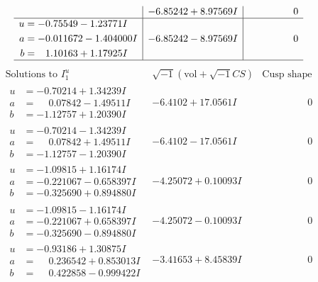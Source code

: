\documentclass[1p]{elsarticle_modified}
\theoremstyle{definition}
\newcommand{\I}{\sqrt{-1}}
\begin{document}
$$\begin{array}{c|c|c}
 & -6.85242 + 8.97569 I & \phantom{-0.000000 } 0 \\ \hline\begin{aligned}
u &= -0.75549 - 1.23771 I \\
a &= -0.011672 - 1.404000 I \\
b &= \phantom{-}1.10163 + 1.17925 I\end{aligned}
 & -6.85242 - 8.97569 I & \phantom{-0.000000 } 0\\
 \hline 
 \end{array}$$\newpage$$\begin{array}{c|c|c}  
\text{Solutions to }I^u_{1}& \I (\text{vol} + \sqrt{-1}CS) & \text{Cusp shape}\\
 \hline 
\begin{aligned}
u &= -0.70214 + 1.34239 I \\
a &= \phantom{-}0.07842 - 1.49511 I \\
b &= -1.12757 + 1.20390 I\end{aligned}
 & -6.4102 + 17.0561 I & \phantom{-0.000000 } 0 \\ \hline\begin{aligned}
u &= -0.70214 - 1.34239 I \\
a &= \phantom{-}0.07842 + 1.49511 I \\
b &= -1.12757 - 1.20390 I\end{aligned}
 & -6.4102 - 17.0561 I & \phantom{-0.000000 } 0 \\ \hline\begin{aligned}
u &= -1.09815 + 1.16174 I \\
a &= -0.221067 - 0.658397 I \\
b &= -0.325690 + 0.894880 I\end{aligned}
 & -4.25072 + 0.10093 I & \phantom{-0.000000 } 0 \\ \hline\begin{aligned}
u &= -1.09815 - 1.16174 I \\
a &= -0.221067 + 0.658397 I \\
b &= -0.325690 - 0.894880 I\end{aligned}
 & -4.25072 - 0.10093 I & \phantom{-0.000000 } 0 \\ \hline\begin{aligned}
u &= -0.93186 + 1.30875 I \\
a &= \phantom{-}0.236542 + 0.853013 I \\
b &= \phantom{-}0.422858 - 0.999422 I\end{aligned}
 & -3.41653 + 8.45839 I & \phantom{-0.000000 } 0 \\ \hline\begin{aligned}

\end{aligned}
\end{array}$$
\end{document}
